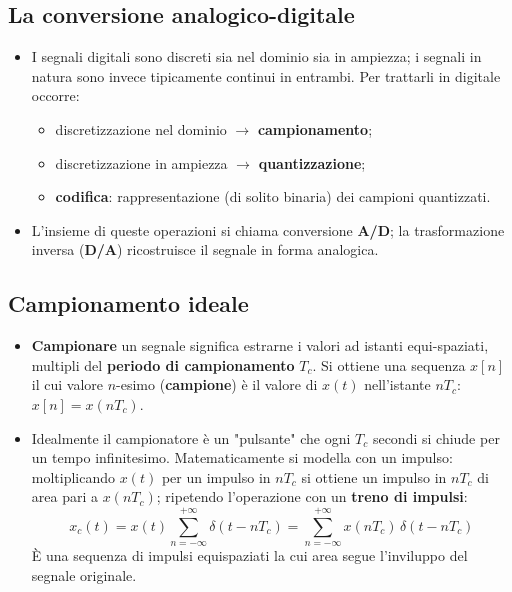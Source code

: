 \documentclass[12pt, a4paper]{article}
\begin{document}
\subsection{La conversione analogico-digitale}
\begin{itemize}
    \item I segnali digitali sono discreti sia nel dominio sia in ampiezza; i segnali in natura sono invece tipicamente continui in entrambi. Per trattarli in digitale occorre:
    \begin{itemize}
        \item discretizzazione nel dominio $\to$ \textbf{campionamento};
        \item discretizzazione in ampiezza $\to$ \textbf{quantizzazione};
        \item \textbf{codifica}: rappresentazione (di solito binaria) dei campioni quantizzati.
    \end{itemize}
    \item L'insieme di queste operazioni si chiama conversione \textbf{A/D}; la trasformazione inversa (\textbf{D/A}) ricostruisce il segnale in forma analogica.
\end{itemize}

\subsection{Campionamento ideale}
\begin{itemize}
    \item \textbf{Campionare} un segnale significa estrarne i valori ad istanti equi-spaziati, multipli del \textbf{periodo di campionamento} $T_c$. Si ottiene una sequenza $x[n]$ il cui valore $n$-esimo (\textbf{campione}) è il valore di $x(t)$ nell'istante $nT_c$: $x[n]=x(nT_c)$.
    \item Idealmente il campionatore è un "pulsante" che ogni $T_c$ secondi si chiude per un tempo infinitesimo. Matematicamente si modella con un impulso: moltiplicando $x(t)$ per un impulso in $nT_c$ si ottiene un impulso in $nT_c$ di area pari a $x(nT_c)$; ripetendo l'operazione con un \textbf{treno di impulsi}:
    $$x_c(t) = x(t)\sum_{n=-\infty}^{+\infty}\delta(t-nT_c) = \sum_{n=-\infty}^{+\infty} x(nT_c)\,\delta(t-nT_c)$$
    È una sequenza di impulsi equispaziati la cui area segue l'inviluppo del segnale originale.
\end{itemize}
\end{document}
